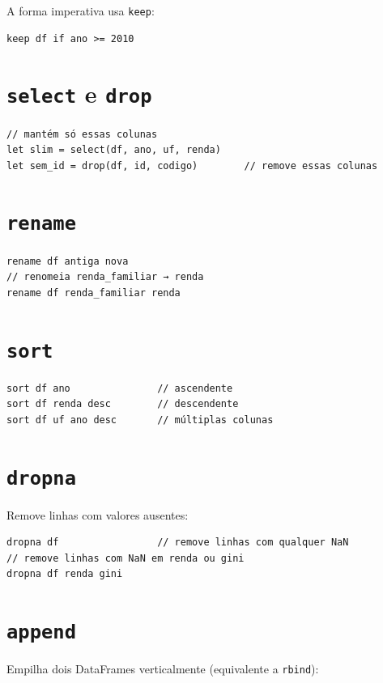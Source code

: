 A forma imperativa usa \lstinline{keep}:

\begin{lstlisting}
keep df if ano >= 2010
\end{lstlisting}

\section{\texttt{select} e \texttt{drop}}

\begin{lstlisting}
// mantém só essas colunas
let slim = select(df, ano, uf, renda)
let sem_id = drop(df, id, codigo)        // remove essas colunas
\end{lstlisting}

\section{\texttt{rename}}

\begin{lstlisting}
rename df antiga nova
// renomeia renda_familiar → renda
rename df renda_familiar renda
\end{lstlisting}

\section{\texttt{sort}}

\begin{lstlisting}
sort df ano               // ascendente
sort df renda desc        // descendente
sort df uf ano desc       // múltiplas colunas
\end{lstlisting}

\section{\texttt{dropna}}

Remove linhas com valores ausentes:

\begin{lstlisting}
dropna df                 // remove linhas com qualquer NaN
// remove linhas com NaN em renda ou gini
dropna df renda gini
\end{lstlisting}

\section{\texttt{append}}

Empilha dois DataFrames verticalmente (equivalente a \texttt{rbind}):

